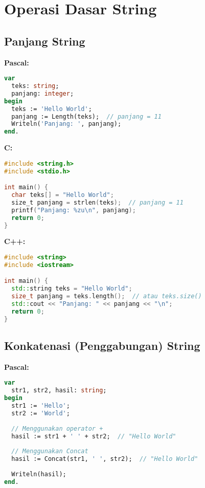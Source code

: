 \documentclass[../main.tex]{subfiles}
\begin{document}
\section{Operasi Dasar String}

\subsection{Panjang String}

\textbf{Pascal:}
\begin{lstlisting}[language=Pascal, caption={Panjang string di Pascal}]
var
  teks: string;
  panjang: integer;
begin
  teks := 'Hello World';
  panjang := Length(teks);  // panjang = 11
  Writeln('Panjang: ', panjang);
end.
\end{lstlisting}

\textbf{C:}
\begin{lstlisting}[language=C, caption={Panjang string di C}]
#include <string.h>
#include <stdio.h>

int main() {
  char teks[] = "Hello World";
  size_t panjang = strlen(teks);  // panjang = 11
  printf("Panjang: %zu\n", panjang);
  return 0;
}
\end{lstlisting}

\textbf{C++:}
\begin{lstlisting}[language=C++, caption={Panjang string di C++}]
#include <string>
#include <iostream>

int main() {
  std::string teks = "Hello World";
  size_t panjang = teks.length();  // atau teks.size()
  std::cout << "Panjang: " << panjang << "\n";
  return 0;
}
\end{lstlisting}

\subsection{Konkatenasi (Penggabungan) String}

\textbf{Pascal:}
\begin{lstlisting}[language=Pascal, caption={Konkatenasi di Pascal}]
var
  str1, str2, hasil: string;
begin
  str1 := 'Hello';
  str2 := 'World';
  
  // Menggunakan operator +
  hasil := str1 + ' ' + str2;  // "Hello World"
  
  // Menggunakan Concat
  hasil := Concat(str1, ' ', str2);  // "Hello World"
  
  Writeln(hasil);
end.
\end{lstlisting}
\end{document}
